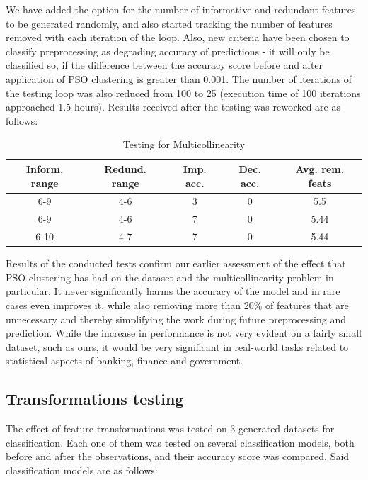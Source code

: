 \documentclass[conference]{IEEEtran}
\begin{document}
We have added the option for the number of informative and redundant features to be generated randomly, and also started tracking the number of features removed with each iteration of the loop. Also, new criteria have been chosen to classify preprocessing as degrading accuracy of predictions - it will only be classified so, if the difference between the accuracy score before and after application of PSO clustering is greater than 0.001. The number of iterations of the testing loop was also reduced from 100 to 25 (execution time of 100 iterations approached 1.5 hours). Results received after the testing was reworked are as follows:

\begin{table}[htbp]
	\caption{Testing for Multicollinearity}
	\begin{center}
		\begin{tabular}{|c|c|c|c|c|}
			\hline
			\textbf{Inform. range}&\textbf{Redund. range}&\textbf{Imp. acc.}&\textbf{Dec. acc.}&\textbf{Avg. rem. feats} \\
			\hline 
			6-9& 4-6& 3& 0& 5.5 \\
			\hline 
			6-9& 4-6& 7& 0& 5.44 \\
			\hline 
			6-10& 4-7& 7& 0& 5.44 \\
			\hline
		\end{tabular}
		\label{tab2}
	\end{center}
\end{table}

Results of the conducted tests confirm our earlier assessment of the effect that PSO clustering has had on the dataset and the multicollinearity problem in particular. It never significantly harms the accuracy of the model and in rare cases even improves it, while also removing more than 20\% of features that are unnecessary and thereby simplifying the work during future preprocessing and prediction. While the increase in performance is not very evident on a fairly small dataset, such as ours, it would be very significant in real-world tasks related to statistical aspects of banking, finance and government.  

\subsection{Transformations testing}

The effect of feature transformations was tested on 3 generated datasets for classification. Each one of them was tested on several classification models, both before and after the observations, and their accuracy score was compared. Said classification models are as follows: 
\end{document}
